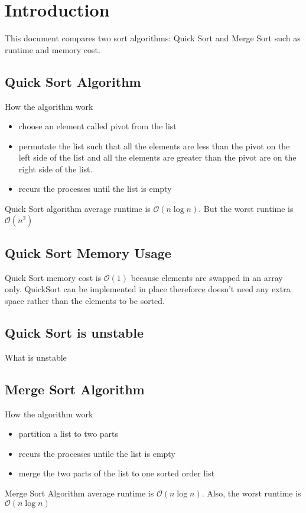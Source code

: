 \documentclass{article}
\begin{document}
\section{Introduction}
This document compares two sort algorithms: Quick Sort and Merge Sort such as runtime and memory cost.
\subsection{Quick Sort Algorithm} 
How the algorithm work
\begin{itemize}
\item choose an element called pivot from the list 
\item permutate the list such that all the elements are less than the pivot on the left side of the list and all the elements are greater than the pivot are on the right side of the list.
\item recurs the processes until the list is empty
\end{itemize} 

Quick Sort algorithm average runtime is $\mathcal{O}(n\log{}n)$.
But the worst runtime is $\mathcal{O}(n^2)$

\subsection{Quick Sort Memory Usage} 
Quick Sort memory cost is $\mathcal{O}(1)$
because elements are swapped in an array only.
QuickSort can be implemented in place thereforce doesn't need any extra space rather than the elements to be sorted.
\subsection{Quick Sort is unstable}
What is unstable

\subsection{Merge Sort Algorithm} 
How the algorithm work
\begin{itemize}
\item partition a list to two parts 
\item recurs the processes untile the list is empty
\item merge the two parts of the list to one sorted order list 
\end{itemize} 
Merge Sort Algorithm average runtime is $\mathcal{O}(n\log{}n)$. Also, the worst runtime is $\mathcal{O}(n\log{}n)$
\end{document}
